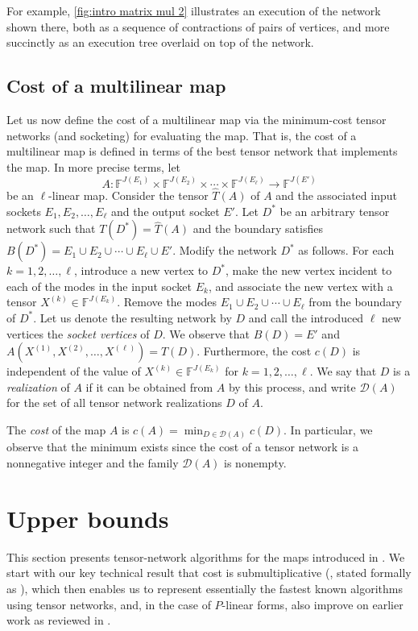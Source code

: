\documentclass{toc}
\newcommand{\F}{\ensuremath{\mathbb{F}}}
\begin{document}
For example, \eqref{fig:intro matrix mul 2} illustrates an execution
of the network shown there, both as a sequence of contractions of
pairs of vertices, and more succinctly as an execution tree overlaid
on top of the network.

\subsection{Cost of a multilinear map}
\label{sec:map cost}

Let us now define the cost of a multilinear map via the minimum-cost
tensor networks (and socketing) for evaluating the map.
That is, the cost of a multilinear map is defined in
terms of the best tensor network that implements the map.
In more precise terms, let
\[
A:\F^{J(E_1)}\times\F^{J(E_2)}\times\cdots \times\F^{J(E_\ell)}
      \rightarrow \F^{J(E')}
\]
be an $\ell$-linear map. Consider the tensor $\hat{T}(A)$ of $A$ and the
associated input sockets $E_1,E_2,\ldots,E_\ell$ and the output socket
$E'$. Let $D^*$ be an arbitrary tensor network such that $T(D^*)=\hat{T}(A)$ and
the boundary satisfies $B(D^*) =E_1\cup E_2\cup\cdots\cup E_\ell\cup E'$.
Modify the network $D^*$ as follows.
For each $k=1,2,\ldots,\ell$, introduce a new vertex to $D^*$,
make the new vertex incident to each of the modes in the input socket $E_k$,
and associate the new vertex with a tensor $X^{(k)}\in\F^{J(E_k)}$.
Remove the modes $E_1\cup E_2\cup\cdots\cup E_\ell$ from the boundary of $D^*$.
Let us denote the resulting network by $D$ and call the introduced $\ell$
new vertices the \emph{socket vertices} of $D$.
We observe that $B(D)=E'$ and $A(X^{(1)},X^{(2)},\ldots,X^{(\ell)})=T(D)$.
Furthermore, the cost $c(D)$ is independent of the value of
$X^{(k)}\in\F^{J(E_k)}$ for $k=1,2,\ldots,\ell$.
We say that $D$ is a \emph{realization} of $A$ if it can be obtained
from $A$ by this process, and write $\mathscr{D}(A)$ for the set of all
tensor network realizations $D$ of $A$.

The \emph{cost} of the map $A$ is
$c(A)=\min_{D\in\mathscr{D}(A)} c(D)$.
In particular, we observe that the minimum exists since the cost of a
tensor network is a nonnegative integer and the family $\mathscr{D}(A)$
is nonempty.

\section{Upper bounds}
\label{sec:upper bounds}

This section presents tensor-network algorithms for the maps
introduced in . We start with our key technical result
that cost is submultiplicative (,
stated formally as ),
which then enables us to represent essentially the fastest known algorithms
using tensor networks, and, in the case of $P$-linear forms, also
improve on earlier work as reviewed in .
\end{document}
